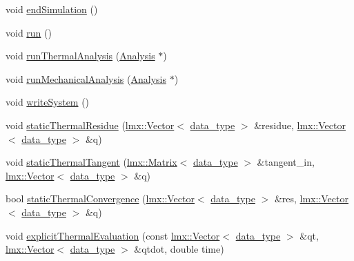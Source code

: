 \begin{DoxyCompactItemize}
\item 
void \hyperlink{classmknix_1_1_simulation_a8df9cf3275d685855b93f6db4dd6f93c}{end\+Simulation} ()
\item 
void \hyperlink{classmknix_1_1_simulation_a616f0712431201275269aa05eadb8779}{run} ()
\item 
void \hyperlink{classmknix_1_1_simulation_ae769b1ff16dc5eada23b3aae69da8168}{run\+Thermal\+Analysis} (\hyperlink{classmknix_1_1_analysis}{Analysis} $\ast$)
\item 
void \hyperlink{classmknix_1_1_simulation_a5b02493acba04c0dd6a1450eb2ae548a}{run\+Mechanical\+Analysis} (\hyperlink{classmknix_1_1_analysis}{Analysis} $\ast$)
\item 
void \hyperlink{classmknix_1_1_simulation_acef86e75795b95441e06f1055402a43b}{write\+System} ()
\item 
void \hyperlink{classmknix_1_1_simulation_ae86305b2478ec8fdffe9f4866f9389e2}{static\+Thermal\+Residue} (\hyperlink{classlmx_1_1_vector}{lmx\+::\+Vector}$<$ \hyperlink{namespacemknix_a16be4b246fbf2cceb141e3a179111020}{data\+\_\+type} $>$ \&residue, \hyperlink{classlmx_1_1_vector}{lmx\+::\+Vector}$<$ \hyperlink{namespacemknix_a16be4b246fbf2cceb141e3a179111020}{data\+\_\+type} $>$ \&q)
\item 
void \hyperlink{classmknix_1_1_simulation_a382593c555de33392bccdcbbdf244737}{static\+Thermal\+Tangent} (\hyperlink{classlmx_1_1_matrix}{lmx\+::\+Matrix}$<$ \hyperlink{namespacemknix_a16be4b246fbf2cceb141e3a179111020}{data\+\_\+type} $>$ \&tangent\+\_\+in, \hyperlink{classlmx_1_1_vector}{lmx\+::\+Vector}$<$ \hyperlink{namespacemknix_a16be4b246fbf2cceb141e3a179111020}{data\+\_\+type} $>$ \&q)
\item 
bool \hyperlink{classmknix_1_1_simulation_adc5bcdaba46bc9e5332e7e142dd4558f}{static\+Thermal\+Convergence} (\hyperlink{classlmx_1_1_vector}{lmx\+::\+Vector}$<$ \hyperlink{namespacemknix_a16be4b246fbf2cceb141e3a179111020}{data\+\_\+type} $>$ \&res, \hyperlink{classlmx_1_1_vector}{lmx\+::\+Vector}$<$ \hyperlink{namespacemknix_a16be4b246fbf2cceb141e3a179111020}{data\+\_\+type} $>$ \&q)
\item 
void \hyperlink{classmknix_1_1_simulation_ac832fe81a1b651b2cd667011de5645f7}{explicit\+Thermal\+Evaluation} (const \hyperlink{classlmx_1_1_vector}{lmx\+::\+Vector}$<$ \hyperlink{namespacemknix_a16be4b246fbf2cceb141e3a179111020}{data\+\_\+type} $>$ \&qt, \hyperlink{classlmx_1_1_vector}{lmx\+::\+Vector}$<$ \hyperlink{namespacemknix_a16be4b246fbf2cceb141e3a179111020}{data\+\_\+type} $>$ \&qtdot, double time)
\item 

\end{DoxyCompactItemize}

